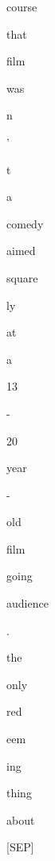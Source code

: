\documentclass[varwidth=150mm]{standalone}
\begin{document}
\begin{CJK*}{UTF8}{gbsn}
{{{\colorbox{red!0.0}{\strut course} \colorbox{red!0.0}{\strut that} \colorbox{red!0.0}{\strut film} \colorbox{red!0.0}{\strut was} \colorbox{red!100.0}{\strut n} \colorbox{red!0.0}{\strut '} \colorbox{red!0.0}{\strut t} \colorbox{red!0.0}{\strut a} \colorbox{red!2.158919334411621}{\strut comedy} \colorbox{red!0.0}{\strut aimed} \colorbox{red!0.0}{\strut square}\colorbox{red!0.0}{\strut ly} \colorbox{red!0.0}{\strut at} \colorbox{red!0.0}{\strut a} \colorbox{red!0.0}{\strut 13} \colorbox{red!0.0}{\strut -} \colorbox{red!0.0}{\strut 20} \colorbox{red!0.0}{\strut year} \colorbox{red!0.0}{\strut -} \colorbox{red!0.0}{\strut old} \colorbox{red!2.201756715774536}{\strut film} \colorbox{red!0.0}{\strut going} \colorbox{red!0.0}{\strut audience} \colorbox{red!0.0}{\strut .} \colorbox{red!9.106141090393066}{\strut the} \colorbox{red!1.2827248573303223}{\strut only} \colorbox{red!0.0}{\strut red}\colorbox{red!0.0}{\strut eem}\colorbox{red!3.031693458557129}{\strut ing} \colorbox{red!2.311607837677002}{\strut thing} \colorbox{red!11.548998832702637}{\strut about} \colorbox{red!1.2324144840240479}{\strut [SEP]}
}}}
\end{CJK*}
\end{document}
